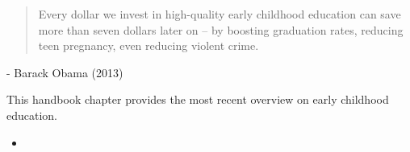 \begin{frame}
\begin{quote}\Large
Every dollar we invest in high-quality early childhood education can save more than seven dollars later on -- by boosting graduation rates, reducing teen pregnancy, even reducing violent crime.
\end{quote}\vspace{-0.5cm}\hspace{6cm} - Barack Obama (2013)
\nocite{Obama.2013, CEA.2015}
\end{frame}
\begin{frame}\begin{figure}
\end{figure}\end{frame}
\begin{frame}
This handbook chapter provides the most recent overview on early childhood education.
\begin{itemize}
\item {}
\end{itemize}
\end{frame}
